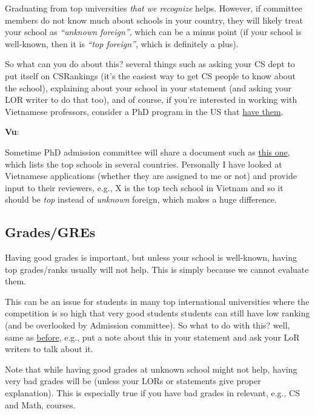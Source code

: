 \documentclass[11pt]{article}
\newenvironment{commentbox}[1][]{
\small
    \begin{cbox}
    \textbf{#1}: 
 }{
   \end{cbox}
}
\newcommand{\red}[1]{{\color{red}{#1}}}
\begin{document}
Graduating from top universities \emph{that we recognize} helps.
However, if committee members do not know much about schools in your country, they will likely treat your school as
\emph{``unknown foreign''}, which can be a minus point (if your school is well-known, then it is \emph{``top foreign''}, which is definitely a plus).

So what can you do about this? several things such as asking your CS dept to put itself on CSRankings (it's the easiest way to get CS people to know about the school), explaining about your school in your statement (and asking your LOR writer to do that too), and of course, if you're interested in working with Vietnamese professors, consider a PhD program in the US that  \href{https://github.com/dynaroars/dynaroars.github.io/wiki/Viet-CS-Profs-US}{have them}.

\begin{commentbox}[Vu]
Sometime PhD admission committee will share a document such as \href{https://github.com/dynaroars/dynaroars.github.io/wiki/Foreign-Top-Schools}{this one}, which lists the top schools in several countries. Personally I have looked at Vietnamese applications (whether they are assigned to me or not) and provide input to their reviewers, e.g., X is the top tech school in Vietnam and so it should be \emph{top} instead of \emph{unknown} foreign, which makes a huge difference.
\end{commentbox}

\subsection{Grades/GREs}\label{sec:grades}


Having good grades is important, but unless your school is well-known, having top grades/ranks
usually will not help. This is simply because we cannot evaluate them.

This can be an issue for students in many top international universities where the competition is so high that very good students students can still have low ranking (and be overlooked by Admission committee).
So what to do with this? well, same as \hyperref[sec:your-school]{before}, e.g., put a note about this in your statement and ask your LoR writers to talk about it.

Note that while having good grades at unknown school might not help,
having very bad grades will be \red{red flag} (unless your LORs or
statements give proper explanation). This is especially true if you
have bad grades in relevant, e.g., CS and Math, courses.
\end{document}
